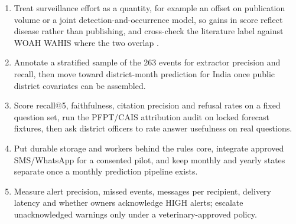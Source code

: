 \documentclass[10pt,openany]{report}
\begin{document}
\begin{enumerate}
  \item Treat surveillance effort as a quantity, for example an offset on publication volume or a
        joint detection-and-occurrence model, so gains in score reflect disease rather than
        publishing, and cross-check the literature label against WOAH WAHIS where the two overlap
        \cite{wahis}.
  \item Annotate a stratified sample of the 263 events for extractor precision and recall, then move
        toward district-month prediction for India once public district covariates can be assembled.
  \item Score recall@5, faithfulness, citation precision and refusal rates on a fixed question set,
        run the PFPT/CAIS attribution audit on locked forecast fixtures, then ask district officers
        to rate answer usefulness on real questions.
  \item Put durable storage and workers behind the rules core, integrate approved SMS/WhatsApp for a
        consented pilot, and keep monthly and yearly states separate once a monthly prediction
        pipeline exists.
  \item Measure alert precision, missed events, messages per recipient, delivery latency and whether
        owners acknowledge HIGH alerts; escalate unacknowledged warnings only under a
        veterinary-approved policy.
\end{enumerate}

\newpage
\end{document}
